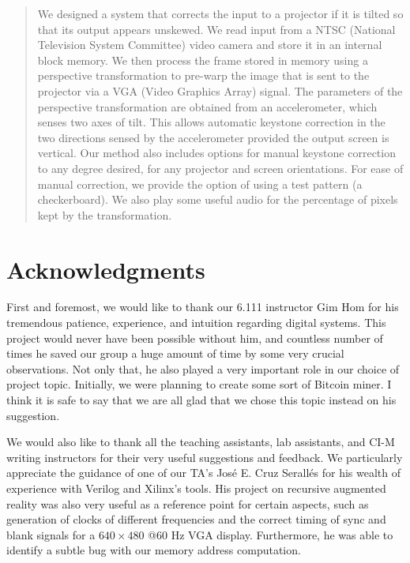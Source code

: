 \documentclass{article}
\begin{document}
\maketitle

\begin{abstract}
We designed a system that corrects the input to a projector if it is tilted so that its output appears unskewed.
We read input from a NTSC (National Television System Committee) video camera and store it in an internal block memory.
We then process the frame stored in memory using a perspective transformation to pre-warp the image that is sent to the projector via a VGA (Video Graphics Array) signal.
The parameters of the perspective transformation are obtained from an accelerometer, which senses two axes of tilt.
This allows automatic keystone correction in the two directions sensed by the accelerometer provided the output screen is vertical.
Our method also includes options for manual keystone correction to any degree desired, for any projector and screen orientations.
For ease of manual correction, we provide the option of using a test pattern (a checkerboard).
We also play some useful audio for the percentage of pixels kept by the transformation.
\end{abstract}

\newpage
\section*{Acknowledgments}
First and foremost, we would like to thank our 6.111 instructor Gim Hom for his tremendous patience, experience, and intuition regarding digital systems.
This project would never have been possible without him,
and countless number of times he saved our group a huge amount of time by some very crucial observations.
Not only that, he also played a very important role in our choice of project topic.
Initially, we were planning to create some sort of Bitcoin miner.
I think it is safe to say that we are all glad that we chose this topic instead on his suggestion.

We would also like to thank all the teaching assistants, lab assistants, and CI-M writing instructors for their very useful suggestions and feedback.
We particularly appreciate the guidance of one of our TA's Jos\'{e} E. Cruz Serall\'{e}s for his wealth of experience with Verilog and Xilinx's tools.
His project on recursive augmented reality was also very useful as a reference point for certain aspects,
such as generation of clocks of different frequencies and the correct timing of sync and blank signals for a $640 \times 480$  @60 Hz VGA display.
Furthermore, he was able to identify a subtle bug with our memory address computation.
\end{document}
